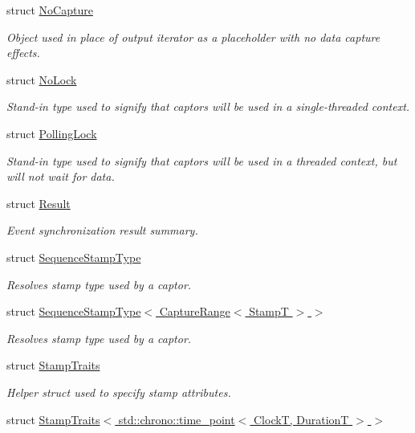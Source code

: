 \begin{DoxyCompactItemize}
struct \hyperlink{structflow_1_1_no_capture}{No\+Capture}
\begin{DoxyCompactList}\small\item\em Object used in place of output iterator as a placeholder with no data capture effects. \end{DoxyCompactList}\item 
struct \hyperlink{structflow_1_1_no_lock}{No\+Lock}
\begin{DoxyCompactList}\small\item\em Stand-\/in type used to signify that captors will be used in a single-\/threaded context. \end{DoxyCompactList}\item 
struct \hyperlink{structflow_1_1_polling_lock}{Polling\+Lock}
\begin{DoxyCompactList}\small\item\em Stand-\/in type used to signify that captors will be used in a threaded context, but will not wait for data. \end{DoxyCompactList}\item 
struct \hyperlink{structflow_1_1_result}{Result}
\begin{DoxyCompactList}\small\item\em Event synchronization result summary. \end{DoxyCompactList}\item 
struct \hyperlink{structflow_1_1_sequence_stamp_type}{Sequence\+Stamp\+Type}
\begin{DoxyCompactList}\small\item\em Resolves stamp type used by a captor. \end{DoxyCompactList}\item 
struct \hyperlink{structflow_1_1_sequence_stamp_type_3_01_capture_range_3_01_stamp_t_01_4_01_4}{Sequence\+Stamp\+Type$<$ Capture\+Range$<$ Stamp\+T $>$ $>$}
\begin{DoxyCompactList}\small\item\em Resolves stamp type used by a captor. \end{DoxyCompactList}\item 
struct \hyperlink{structflow_1_1_stamp_traits}{Stamp\+Traits}
\begin{DoxyCompactList}\small\item\em Helper struct used to specify stamp attributes. \end{DoxyCompactList}\item 
struct \hyperlink{structflow_1_1_stamp_traits_3_01std_1_1chrono_1_1time__point_3_01_clock_t_00_01_duration_t_01_4_01_4}{Stamp\+Traits$<$ std\+::chrono\+::time\+\_\+point$<$ Clock\+T, Duration\+T $>$ $>$}

\end{DoxyCompactItemize}
